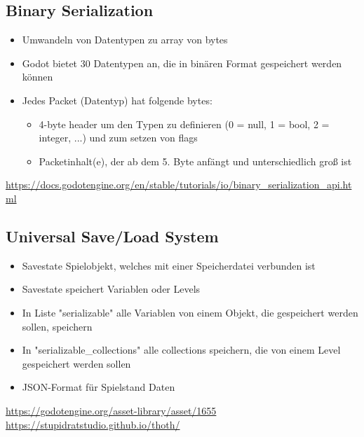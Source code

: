 \subsection{Binary Serialization}

\begin{itemize}
    \item Umwandeln von Datentypen zu array von bytes
    \item Godot bietet 30 Datentypen an, die in binären Format gespeichert werden können
    \item Jedes Packet (Datentyp) hat folgende bytes:
    \begin{itemize}
        \item 4-byte header um den Typen zu definieren (0 = null, 1 = bool, 2 = integer, ...) und zum setzen von flags
        \item Packetinhalt(e), der ab dem 5. Byte anfängt und unterschiedlich groß ist 
    \end{itemize}
\end{itemize}

\url{https://docs.godotengine.org/en/stable/tutorials/io/binary_serialization_api.html}

\subsection{Universal Save/Load System}

\begin{itemize}
    \item Savestate Spielobjekt, welches mit einer Speicherdatei verbunden ist
    \item Savestate speichert Variablen oder Levels
    \item In Liste "serializable" alle Variablen von einem Objekt, die gespeichert werden sollen, speichern
    \item In "serializable\_collections" alle collections speichern, die von einem Level gespeichert werden sollen
    \item JSON-Format für Spielstand Daten
\end{itemize}

\url{https://godotengine.org/asset-library/asset/1655}\\
\url{https://stupidratstudio.github.io/thoth/}